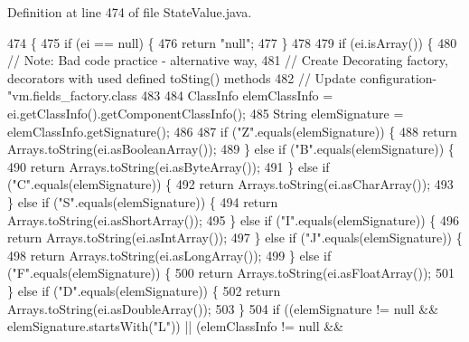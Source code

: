 Definition at line 474 of file State\+Value.\+java.


\begin{DoxyCode}
474                                                            \{
475     \textcolor{keywordflow}{if} (ei == null) \{
476       \textcolor{keywordflow}{return} \textcolor{stringliteral}{"null"};
477     \}
478 
479     \textcolor{keywordflow}{if} (ei.isArray()) \{
480       \textcolor{comment}{// Note: Bad code practice - alternative way,}
481       \textcolor{comment}{// Create Decorating factory, decorators with used defined toSting() methods}
482       \textcolor{comment}{// Update configuration- "vm.fields\_factory.class}
483 
484       ClassInfo elemClassInfo = ei.getClassInfo().getComponentClassInfo();
485       String elemSignature = elemClassInfo.getSignature();
486 
487       \textcolor{keywordflow}{if} (\textcolor{stringliteral}{"Z"}.equals(elemSignature)) \{
488         \textcolor{keywordflow}{return} Arrays.toString(ei.asBooleanArray());
489       \} \textcolor{keywordflow}{else} \textcolor{keywordflow}{if} (\textcolor{stringliteral}{"B"}.equals(elemSignature)) \{
490         \textcolor{keywordflow}{return} Arrays.toString(ei.asByteArray());
491       \} \textcolor{keywordflow}{else} \textcolor{keywordflow}{if} (\textcolor{stringliteral}{"C"}.equals(elemSignature)) \{
492         \textcolor{keywordflow}{return} Arrays.toString(ei.asCharArray());
493       \} \textcolor{keywordflow}{else} \textcolor{keywordflow}{if} (\textcolor{stringliteral}{"S"}.equals(elemSignature)) \{
494         \textcolor{keywordflow}{return} Arrays.toString(ei.asShortArray());
495       \} \textcolor{keywordflow}{else} \textcolor{keywordflow}{if} (\textcolor{stringliteral}{"I"}.equals(elemSignature)) \{
496         \textcolor{keywordflow}{return} Arrays.toString(ei.asIntArray());
497       \} \textcolor{keywordflow}{else} \textcolor{keywordflow}{if} (\textcolor{stringliteral}{"J"}.equals(elemSignature)) \{
498         \textcolor{keywordflow}{return} Arrays.toString(ei.asLongArray());
499       \} \textcolor{keywordflow}{else} \textcolor{keywordflow}{if} (\textcolor{stringliteral}{"F"}.equals(elemSignature)) \{
500         \textcolor{keywordflow}{return} Arrays.toString(ei.asFloatArray());
501       \} \textcolor{keywordflow}{else} \textcolor{keywordflow}{if} (\textcolor{stringliteral}{"D"}.equals(elemSignature)) \{
502         \textcolor{keywordflow}{return} Arrays.toString(ei.asDoubleArray());
503       \}
504       \textcolor{keywordflow}{if} ((elemSignature != null && elemSignature.startsWith(\textcolor{stringliteral}{"L"})) || (elemClassInfo != null && 

\end{DoxyCode}
